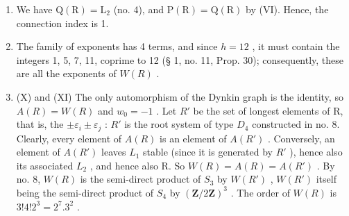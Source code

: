 \begin{enumerate}
\def\labelenumi{(\Roman{enumi})}
\setcounter{enumi}{7}
\item
  We have \(\mathrm{Q}(\mathrm{R}) = \mathrm{L}_2\) (no. 4), and \(\mathrm{P}(\mathrm{R}) = \mathrm{Q}(\mathrm{R})\) by (VI). Hence, the connection index is 1.
\item
  The family of exponents has 4 terms, and since \(h = 12\) , it must contain the integers 1, 5, 7, 11, coprime to 12 (§ 1, no. 11, Prop. 30); consequently, these are all the exponents of \(W(R)\) .
\item
  (X) and (XI) The only automorphism of the Dynkin graph is the identity, so \(A(R) = W(R)\) and \(w_{0} = -1\) . Let \(R'\) be the set of longest elements of R, that is, the \(\pm\varepsilon_{i} \pm \varepsilon_{j}\) : \(R'\) is the root system of type \(D_{4}\) constructed in no. 8. Clearly, every element of \(A(R)\) is an element of \(A(R')\) . Conversely, an element of \(A(R')\) leaves \(L_{1}\) stable (since it is generated by \(R'\) ), hence also its associated \(L_{2}\) , and hence also R. So \(W(R) = A(R) = A(R')\) . By no. 8, \(W(R)\) is the semi-direct product of \(S_{3}\) by \(W(R')\) , \(W(R')\) itself being the semi-direct product of \(S_{4}\) by \((\mathbf{Z}/2\mathbf{Z})^{3}\) . The order of \(W(R)\) is \(3!4!2^{3} = 2^{7}.3^{2}\) .
\end{enumerate}

